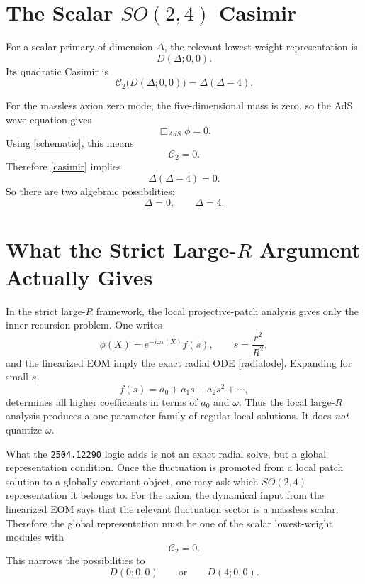 \documentclass[12pt]{article}
\newcommand{\D}{\Delta}
\newcommand{\cC}{\mathcal{C}}
\begin{document}
\section{The Scalar \texorpdfstring{$SO(2,4)$}{SO(2,4)} Casimir}

For a scalar primary of dimension $\D$, the relevant lowest-weight representation is
\begin{equation}
D(\D;0,0).
\end{equation}
Its quadratic Casimir is
\begin{equation}
\cC_2\big(D(\D;0,0)\big)=\D(\D-4).
\label{casimir}
\end{equation}

For the massless axion zero mode, the five-dimensional mass is zero, so the AdS wave equation gives
\begin{equation}
\Box_{AdS}\phi=0.
\end{equation}
Using \eqref{schematic}, this means
\begin{equation}
\cC_2=0.
\end{equation}
Therefore \eqref{casimir} implies
\begin{equation}
\D(\D-4)=0.
\label{dbranches}
\end{equation}
So there are two algebraic possibilities:
\begin{equation}
\D=0,\qquad \D=4.
\end{equation}

\section{What the Strict Large-\texorpdfstring{$R$}{R} Argument Actually Gives}

In the strict large-$R$ framework, the local projective-patch analysis gives only the inner recursion
problem.  One writes
\begin{equation}
\phi(X)=e^{-i\omega\tau(X)}f(s),
\qquad
s=\frac{r^2}{R^2},
\end{equation}
and the linearized EOM imply the exact radial ODE \eqref{radialode}.  Expanding for small $s$,
\begin{equation}
f(s)=a_0+a_1 s+a_2 s^2+\cdots,
\end{equation}
determines all higher coefficients in terms of $a_0$ and $\omega$.  Thus the local large-$R$ analysis
produces a one-parameter family of regular local solutions.  It does \emph{not} quantize $\omega$.

What the \texttt{2504.12290} logic adds is not an exact radial solve, but a global representation
condition.  Once the fluctuation is promoted from a local patch solution to a globally covariant object,
one may ask which $SO(2,4)$ representation it belongs to.  For the axion, the dynamical input from the
linearized EOM says that the relevant fluctuation sector is a massless scalar.  Therefore the global
representation must be one of the scalar lowest-weight modules with
\begin{equation}
\cC_2=0.
\end{equation}
This narrows the possibilities to
\begin{equation}
D(0;0,0)
\qquad \text{or} \qquad
D(4;0,0).
\end{equation}
\end{document}
